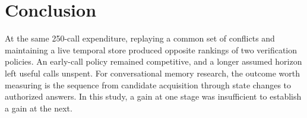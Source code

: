 \documentclass[11pt]{article}
\begin{document}
\section{Conclusion}

At the same 250-call expenditure, replaying a common set of conflicts and maintaining a live temporal store produced opposite rankings of two verification policies. An early-call policy remained competitive, and a longer assumed horizon left useful calls unspent. For conversational memory research, the outcome worth measuring is the sequence from candidate acquisition through state changes to authorized answers. In this study, a gain at one stage was insufficient to establish a gain at the next.




\end{document}
